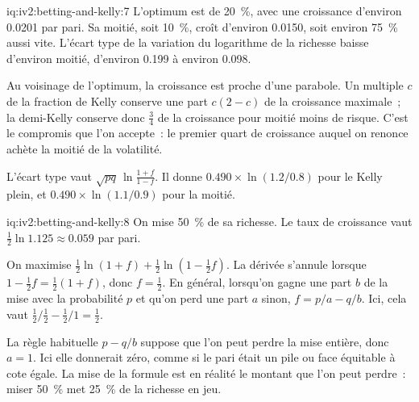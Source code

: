 \begin{solution}{iq:iv2:betting-and-kelly:7}
L'optimum est de 20~\%, avec une croissance d'environ 0.0201 par pari. Sa moitié, soit 10~\%, croît d'environ 0.0150, soit environ 75~\% aussi vite. L'écart type de la variation du logarithme de la richesse baisse d'environ moitié, d'environ 0.199 à environ 0.098.

Au voisinage de l'optimum, la croissance est proche d'une parabole. Un multiple $c$ de la fraction de Kelly conserve une part $c(2 - c)$ de la croissance maximale~; la demi-Kelly conserve donc $\tfrac34$ de la croissance pour moitié moins de risque. C'est le compromis que l'on accepte~: le premier quart de croissance auquel on renonce achète la moitié de la volatilité.

L'écart type vaut $\sqrt{pq}\,\ln\tfrac{1 + f}{1 - f}$. Il donne $0.490 \times \ln(1.2/0.8)$ pour le Kelly plein, et $0.490 \times \ln(1.1/0.9)$ pour la moitié.

\end{solution}

\begin{solution}{iq:iv2:betting-and-kelly:8}
On mise 50~\% de sa richesse. Le taux de croissance vaut $\tfrac12\ln 1.125 \approx 0.059$ par pari.

On maximise $\tfrac12\ln(1 + f) + \tfrac12\ln(1 - \tfrac12 f)$. La dérivée s'annule lorsque $1 - \tfrac12 f = \tfrac12(1 + f)$, donc $f = \tfrac12$. En général, lorsqu'on gagne une part $b$ de la mise avec la probabilité $p$ et qu'on perd une part $a$ sinon, $f = p/a - q/b$. Ici, cela vaut $\tfrac12/\tfrac12 - \tfrac12/1 = \tfrac12$.

La règle habituelle $p - q/b$ suppose que l'on peut perdre la mise entière, donc $a = 1$. Ici elle donnerait zéro, comme si le pari était un pile ou face équitable à cote égale. La mise de la formule est en réalité le montant que l'on peut perdre~: miser 50~\% met 25~\% de la richesse en jeu.

\end{solution}

